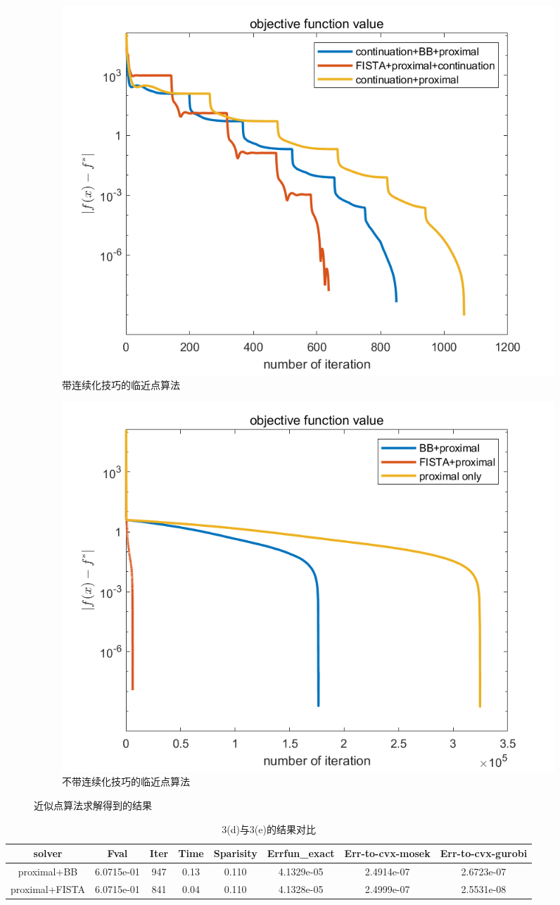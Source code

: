 \documentclass[10pt,a4paper]{article}
\begin{document}
\begin{figure}[ht]
	\centering
	\begin{subfigure}[b]{0.45\textwidth}
	\includegraphics[width=\textwidth]{figure.3(c)&3(d).proximal1.png}
	\caption{带连续化技巧的临近点算法}
	\label{fig:sub1}
	\end{subfigure}
	\hfill
	\begin{subfigure}[b]{0.45\textwidth}
	\includegraphics[width=\textwidth]{figure.3(c)&3(d).proximal2.png}
	\caption{不带连续化技巧的临近点算法}
	\label{fig:sub2}
	\end{subfigure}
	\caption{近似点算法求解得到的结果}
	\label{13}
\end{figure}
\begin{table}[h]
	\centering
	\begin{tabular}{|c|c|c|c|c|c|c|c|}
		\hline
		solver& Fval&Iter  &Time&Sparisity& Errfun\_exact &Err-to-cvx-mosek&Err-to-cvx-gurobi\\
		\hline
		proximal+BB&6.0715e-01&947&0.13&0.110&4.1329e-05&2.4914e-07&2.6723e-07\\
		\hline
		proximal+FISTA&6.0715e-01&841&0.04&0.110&4.1328e-05&2.4999e-07&2.5531e-08\\
		\hline
	\end{tabular}
	\caption{3(d)与3(e)的结果对比}
	\label{14}
\end{table}
\end{document}

